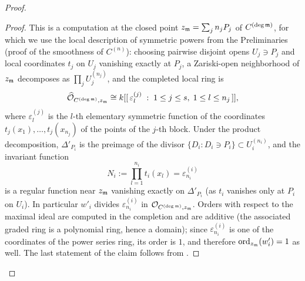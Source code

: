 \begin{proof}
\begin{proof}
        This is a computation at the closed point $z_{\mathfrak{m}} = \sum_j n_j P_j$ of $C^{(\deg\mathfrak{m})}$,
        for which we use the local description of symmetric powers from the Preliminaries
        (proof of the smoothness of $C^{(n)}$): choosing pairwise disjoint opens $U_j \ni P_j$ and
        local coordinates $t_j$ on $U_j$ vanishing exactly at $P_j$, a Zariski-open neighborhood of
        $z_{\mathfrak{m}}$ decomposes as $\prod_j U_j^{(n_j)}$, and the completed local ring is
        \[ \widehat{\mathcal{O}}_{C^{(\deg\mathfrak{m})}, z_{\mathfrak{m}}} \cong
           k[[\, \varepsilon^{(j)}_l \; : \; 1 \leq j \leq s, \; 1 \leq l \leq n_j \,]], \]
        where $\varepsilon^{(j)}_l$ is the $l$-th elementary symmetric function of the coordinates
        $t_j(x_1), \dots, t_j(x_{n_j})$ of the points of the $j$-th block. Under the product
        decomposition, $\Delta'_{P_i}$ is the preimage of the divisor
        $\{D_i : D_i \ni P_i\} \subset U_i^{(n_i)}$, and the invariant function
        \[ N_i := \prod_{l=1}^{n_i} t_i(x_l) = \varepsilon^{(i)}_{n_i} \]
        is a regular function near $z_{\mathfrak{m}}$ vanishing exactly on $\Delta'_{P_i}$
        (as $t_i$ vanishes only at $P_i$ on $U_i$). In particular $w'_i$ divides
        $\varepsilon^{(i)}_{n_i}$ in $\mathcal{O}_{C^{(\deg\mathfrak{m})}, z_{\mathfrak{m}}}$. Orders with respect to the
        maximal ideal are computed in the completion and are additive (the associated graded ring is a
        polynomial ring, hence a domain); since $\varepsilon^{(i)}_{n_i}$ is one of the coordinates of
        the power series ring, its order is $1$, and therefore
        $\operatorname{ord}_{z_{\mathfrak{m}}}(w'_i) = 1$ as well. The last statement of the claim follows from
        .
    \end{proof}


\end{proof}
